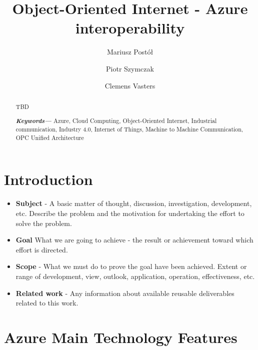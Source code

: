 \documentclass{article}
\title{Object-Oriented Internet - Azure interoperability}
\author[1]{Mariusz Postół}
\author[2]{Piotr Szymczak}
\author[3]{Clemens Vasters}
\affil[1, 2]{Institute of Information Technology, Lodz University of Technology, Łódź, Poland}
\affil[3]{Microsort}
\providecommand{\tightlist} { \setlength{\itemsep}{0pt}\setlength{\parskip}{0pt}}
\providecommand{\keywords}[1]{  \small	  \textbf{\textit{Keywords---}} #1 }
\begin{document}
 

\maketitle


\begin{abstract}

TBD

\keywords{Azure, Cloud Computing, Object-Oriented Internet, Industrial communication, Industry 4.0, Internet of Things, Machine to Machine Communication, OPC Unified Architecture}

\end{abstract}

\maketitle

\hypertarget{introduction}{%
  \section{Introduction}\label{introduction}}

\begin{itemize}
  \tightlist
  \item
        \textbf{Subject} - A basic matter of thought, discussion,
        investigation, development, etc. Describe the problem and the
        motivation for undertaking the effort to solve the problem.
  \item
        \textbf{Goal} What we are going to achieve - the result or achievement
        toward which effort is directed.
  \item
        \textbf{Scope} - What we must do to prove the goal have been achieved.
        Extent or range of development, view, outlook, application, operation,
        effectiveness, etc.
  \item
        \textbf{Related work} - Any information about available reusable
        deliverables related to this work.
\end{itemize}

\hypertarget{azure-main-technology-features}{%
  \section{Azure Main Technology
    Features}\label{azure-main-technology-features}}
\end{document}
